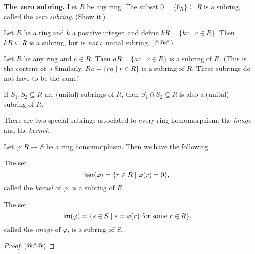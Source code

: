 \begin{examples}
\item \textbf{The zero subring.} Let \(R\) be any ring.
The subset \(0 = \{0_R\} \subseteq R\) is a subring, called the \emph{zero subring}.
(Show it!)

\item Let \(R\) be a ring and \(k\) a positive integer, and define \(kR = \{ kr \mid r \in R \}\).
Then \(kR \subseteq R\) is a subring, but is \emph{not} a unital subring. (@@@)

\item Let \(R\) be any ring and \(a \in R\).
Then \(aR = \{ ar \mid r \in R \}\) is a subring of \(R\).
(This is the content of .)
Similarly, \(Ra = \{ ra \mid r \in R \}\) is a subring of \(R\).
These subrings do not have to be the same!

\item If \(S_1, S_2 \subseteq R\) are (unital) subrings of \(R\), then \(S_1 \cap S_2 \subseteq R\) is also a (unital) subring of \(R\).
\end{examples}

There are two special subrings associated to every ring homomorphism: the \emph{image} and the \emph{kernel}.

\begin{prop} \label{dfn:im-ker}
Let \(\varphi : R \rightarrow S\) be a ring homomorphism.
Then we have the following.
\begin{proplist}
\item The set \[  \mathsf{ker}(\varphi)  = \{ r \in R \mid \varphi(r) = 0 \}, \] called the \emph{kernel} of \(\varphi\), is a subring of \(R\).
\item The set \[  \mathsf{im}(\varphi)  = \{ s \in S \mid s = \varphi(r)\ \mathrm{for\ some}\ r \in R \}, \] called the \emph{image} of \(\varphi\), is a subring of \(S\).
\end{proplist}
\end{prop}

\begin{proof}
(@@@)
\end{proof}

